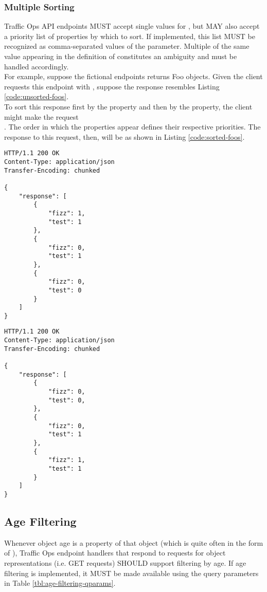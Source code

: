 \subsubsection{Multiple Sorting}
Traffic Ops API endpoints MUST accept single values for , but MAY also accept a priority list of properties by which to sort.
If implemented, this list MUST be recognized as comma-separated values of the  parameter. Multiple of the same value appearing
in the definition of  constitutes an ambiguity and must be handled accordingly.\\
For example, suppose the fictional  endpoints returns Foo objects. Given the client requests this endpoint with
, suppose the response resembles Listing \ref{code:unsorted-foos}.\\
To sort this response first by the  property and then by the  property, the client might make the request\\
. The order in which the properties appear defines their respective
priorities. The response to this request, then, will be as shown in Listing \ref{code:sorted-foos}.

\newpage{}

\begin{codelisting}
\label{code:unsorted-foos}
\begin{verbatim}
HTTP/1.1 200 OK
Content-Type: application/json
Transfer-Encoding: chunked

{
	"response": [
		{
			"fizz": 1,
			"test": 1
		},
		{
			"fizz": 0,
			"test": 1
		},
		{
			"fizz": 0,
			"test": 0
		}
	]
}
\end{verbatim}
\end{codelisting}

\begin{codelisting}
\label{code:sorted-foos}
\begin{verbatim}
HTTP/1.1 200 OK
Content-Type: application/json
Transfer-Encoding: chunked

{
	"response": [
		{
			"fizz": 0,
			"test": 0,
		},
		{
			"fizz": 0,
			"test": 1
		},
		{
			"fizz": 1,
			"test": 1
		}
	]
}
\end{verbatim}
\end{codelisting}

\subsection{Age Filtering}
Whenever object age is a property of that object (which is quite often in the form of ), Traffic Ops endpoint
handlers that respond to requests for object representations (i.e. GET requests) SHOULD support filtering by age. If age filtering
is implemented, it MUST be made available using the query parameters in Table \ref{tbl:age-filtering-qparams}.

